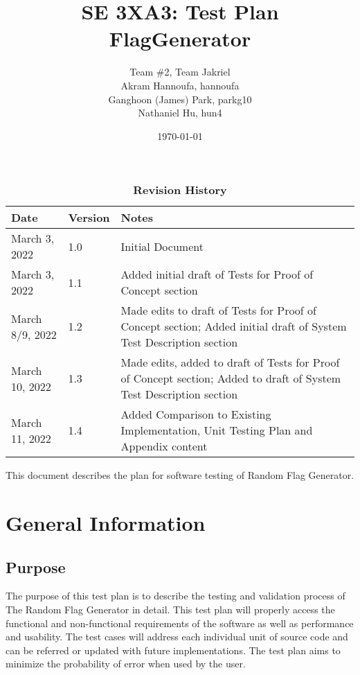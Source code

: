 \documentclass[12pt, titlepage]{article}
\title{SE 3XA3: Test Plan\\FlagGenerator}
\author{Team \#2, Team Jakriel
		\\ Akram Hannoufa, hannoufa
		\\ Ganghoon (James) Park, parkg10
		\\ Nathaniel Hu, hun4
}
\date{\today}
\begin{document}
\maketitle

\tableofcontents
\listoftables

\newpage
\begin{table}[h]
\caption{\bf Revision History}
\begin{tabularx}{\textwidth}{p{3cm}p{2cm}X}
\toprule {\bf Date} & {\bf Version} & {\bf Notes}\\
\midrule
March 3, 2022 & 1.0 & Initial Document\\
March 3, 2022 & 1.1 & Added initial draft of Tests for Proof of Concept section\\
March 8/9, 2022 & 1.2 & Made edits to draft of Tests for Proof of Concept section; Added initial draft of System Test Description section\\
March 10, 2022 & 1.3 & Made edits, added to draft of Tests for Proof of
Concept section; Added to draft of System Test Description section\\
March 11, 2022 & 1.4 & Added Comparison to Existing Implementation, Unit Testing Plan and Appendix content\\
\bottomrule
\end{tabularx}
\end{table}

\newpage


This document describes the plan for software testing of Random Flag Generator.

\section{General Information}

\subsection{Purpose}
The purpose of this test plan is to describe the testing and validation process of The Random Flag Generator in detail. This test plan will properly access the functional and non-functional requirements of the software as well as performance and usability. The test cases will address each individual unit of source code and can be referred or updated with future implementations. The test plan aims to minimize the probability of error when used by the user. 
\end{document}
